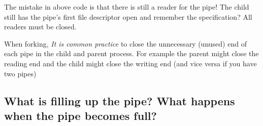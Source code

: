 \begin{Shaded}
\begin{Highlighting}[]

  
    \NormalTok{, }\NormalTok{, }\NormalTok{);}
\NormalTok{\}}

 
     \NormalTok{filedes[}\NormalTok{];}
    
     \NormalTok{) \{ }
        \NormalTok{close(filedes[}\NormalTok{]);}
    \NormalTok{\} } \NormalTok{\{}
        \NormalTok{write(filedes[}\NormalTok{], }\NormalTok{, }\NormalTok{);}
        \NormalTok{);}
        \NormalTok{write(filedes[}\NormalTok{], }\NormalTok{, }\NormalTok{);}
        \NormalTok{, }\NormalTok{, }\NormalTok{);}
    \NormalTok{\}}
     \NormalTok{;}
\NormalTok{\}}
\end{Highlighting}
\end{Shaded}

The mistake in above code is that there is still a reader for the pipe!
The child still has the pipe's first file descriptor open and remember
the specification? All readers must be closed.

When forking, \emph{It is common practice} to close the unnecessary
(unused) end of each pipe in the child and parent process. For example
the parent might close the reading end and the child might close the
writing end (and vice versa if you have two pipes)

\subsection{What is filling up the pipe? What happens when the pipe
becomes
full?}\label{what-is-filling-up-the-pipe-what-happens-when-the-pipe-becomes-full}

